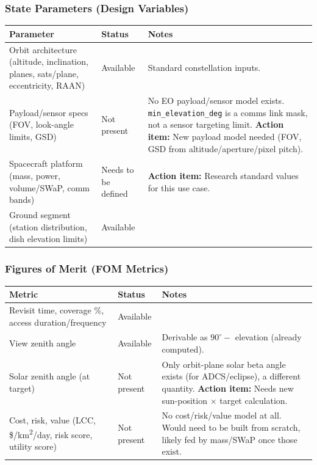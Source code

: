 \documentclass[11pt]{article}
\newcommand{\actionitem}[1]{\textcolor{todo}{\textbf{Action item:}} #1}
\begin{document}
\subsubsection{State Parameters (Design Variables)}

\begin{longtable}{p{4cm}p{2.3cm}p{7.4cm}}
\toprule
\textbf{Parameter} & \textbf{Status} & \textbf{Notes} \\
\midrule
\endhead
Orbit architecture (altitude, inclination, planes, sats/plane, eccentricity, RAAN) & Available & Standard constellation inputs. \\
Payload/sensor specs (FOV, look-angle limits, GSD) & \textcolor{openq}{Not present} & No EO payload/sensor model exists. \texttt{min\_elevation\_deg} is a comms link mask, not a sensor targeting limit. \actionitem{New payload model needed (FOV, GSD from altitude/aperture/pixel pitch).} \\
Spacecraft platform (mass, power, volume/SWaP, comm bands) & \textcolor{openq}{Needs to be defined} & \actionitem{Research standard values for this use case.} \\
Ground segment (station distribution, dish elevation limits) & Available & \\
\bottomrule
\end{longtable}

\subsubsection{Figures of Merit (FOM Metrics)}

\begin{longtable}{p{4cm}p{2.3cm}p{7.4cm}}
\toprule
\textbf{Metric} & \textbf{Status} & \textbf{Notes} \\
\midrule
\endhead
Revisit time, coverage \%, access duration/frequency & Available & \\
View zenith angle & Available & Derivable as $90^\circ - $ elevation (already computed). \\
Solar zenith angle (at target) & \textcolor{openq}{Not present} & Only orbit-plane solar beta angle exists (for ADCS/eclipse), a different quantity. \actionitem{Needs new sun-position $\times$ target calculation.} \\
Cost, risk, value (LCC, \$/km\textsuperscript{2}/day, risk score, utility score) & \textcolor{openq}{Not present} & No cost/risk/value model at all. Would need to be built from scratch, likely fed by mass/SWaP once those exist. \\
\bottomrule
\end{longtable}
\end{document}
